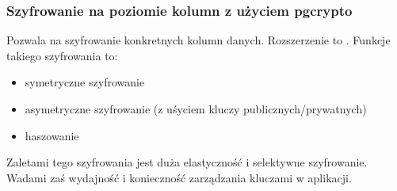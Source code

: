 \documentclass[letterpaper,10pt,polish]{sphinxmanual}
\begin{document}
\subsubsection{Szyfrowanie na poziomie kolumn z użyciem pgcrypto}
\label{\detokenize{rozdzial2/bezpieczenstwo/index:szyfrowanie-na-poziomie-kolumn-z-uzyciem-pgcrypto}}
\sphinxAtStartPar
Pozwala na szyfrowanie konkretnych kolumn danych. Rozszerzenie to . Funkcje takiego szyfrowania to:
\begin{itemize}
\item {} 
\sphinxAtStartPar
symetryczne szyfrowanie

\end{itemize}

\begin{sphinxVerbatim}[commandchars=\\\{\}]
  
  
\end{sphinxVerbatim}
\begin{itemize}
\item {} 
\sphinxAtStartPar
asymetryczne szyfrowanie (z uśyciem kluczy publicznych/prywatnych)

\item {} 
\sphinxAtStartPar
haszowanie

\end{itemize}

\begin{sphinxVerbatim}[commandchars=\\\{\}]
  
\end{sphinxVerbatim}

\sphinxAtStartPar
Zaletami tego szyfrowania jest duża elastyczność i selektywne szyfrowanie. Wadami zaś wydajność i konieczność zarządzania kluczami w aplikacji.
\end{document}
